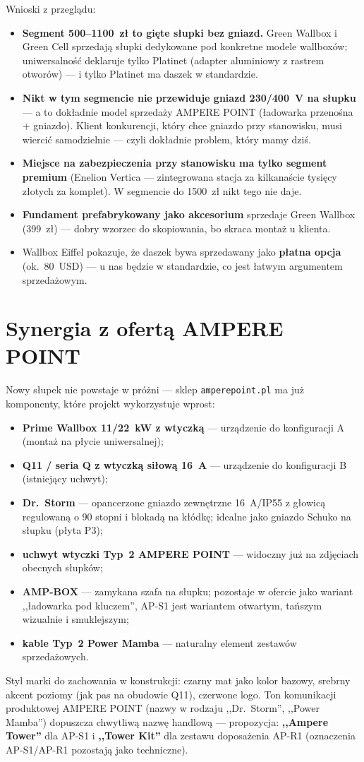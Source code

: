 \documentclass[11pt,a4paper]{article}
\begin{document}
Wnioski z przeglądu:
\begin{itemize}
\item \textbf{Segment 500--1100~zł to gięte słupki bez gniazd.} Green Wallbox i Green Cell sprzedają
słupki dedykowane pod konkretne modele wallboxów; uniwersalność deklaruje tylko Platinet (adapter
aluminiowy z rastrem otworów) --- i tylko Platinet ma daszek w standardzie.
\item \textbf{Nikt w tym segmencie nie przewiduje gniazd 230/400~V na słupku} --- a to dokładnie
model sprzedaży AMPERE POINT (ładowarka przenośna + gniazdo). Klient konkurencji, który chce gniazdo
przy stanowisku, musi wiercić samodzielnie --- czyli dokładnie problem, który mamy dziś.
\item \textbf{Miejsce na zabezpieczenia przy stanowisku ma tylko segment premium} (Enelion Vertica ---
zintegrowana stacja za kilkanaście tysięcy złotych za komplet). W segmencie do 1500~zł nikt tego nie daje.
\item \textbf{Fundament prefabrykowany jako akcesorium} sprzedaje Green Wallbox (399~zł) --- dobry
wzorzec do skopiowania, bo skraca montaż u klienta.
\item Wallbox Eiffel pokazuje, że daszek bywa sprzedawany jako \textbf{płatna opcja} (ok.~80~USD) ---
u nas będzie w standardzie, co jest łatwym argumentem sprzedażowym.
\end{itemize}

\section{Synergia z ofertą AMPERE POINT}
Nowy słupek nie powstaje w próżni --- sklep \texttt{amperepoint.pl} ma już komponenty, które projekt
wykorzystuje wprost:
\begin{itemize}
\item \textbf{Prime Wallbox 11/22~kW z wtyczką} --- urządzenie do konfiguracji A (montaż na płycie
uniwersalnej);
\item \textbf{Q11 / seria Q z wtyczką siłową 16~A} --- urządzenie do konfiguracji B (istniejący uchwyt);
\item \textbf{Dr.~Storm} --- opancerzone gniazdo zewnętrzne 16~A/IP55 z głowicą regulowaną o 90 stopni
i blokadą na kłódkę; idealne jako gniazdo Schuko na słupku (płyta P3);
\item \textbf{uchwyt wtyczki Typ~2 AMPERE POINT} --- widoczny już na zdjęciach obecnych słupków;
\item \textbf{AMP-BOX} --- zamykana szafa na słupku; pozostaje w ofercie jako wariant ,,ładowarka pod
kluczem'', AP-S1 jest wariantem otwartym, tańszym wizualnie i smuklejszym;
\item \textbf{kable Typ~2 Power Mamba} --- naturalny element zestawów sprzedażowych.
\end{itemize}
Styl marki do zachowania w konstrukcji: czarny mat jako kolor bazowy, srebrny akcent poziomy
(jak pas na obudowie Q11), czerwone logo. Ton komunikacji produktowej AMPERE POINT (nazwy w rodzaju
,,Dr.~Storm'', ,,Power Mamba'') dopuszcza chwytliwą nazwę handlową --- propozycja: \textbf{,,Ampere
Tower''} dla AP-S1 i \textbf{,,Tower Kit''} dla zestawu doposażenia AP-R1 (oznaczenia AP-S1/AP-R1
pozostają jako techniczne).
\end{document}
